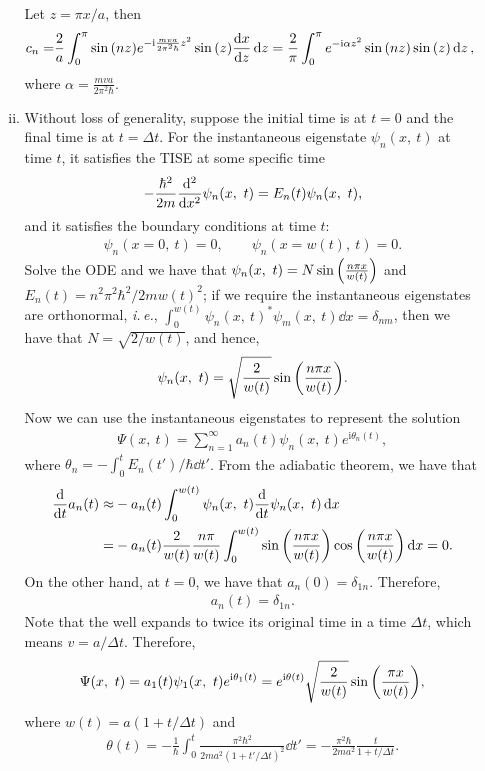 \documentclass{article}
\newcommand{\iu}{\ensuremath{\mathrm{i}}}
\begin{document}
\begin{enumerate}[1.]
\begin{enumerate}[(i)]
    Let $z = \pi x /a$, then
    \begin{align*}
      c_n =& \frac{2}{a} \int_0^\pi \sin\qty(nz) e^{-\iu\frac{mva}{2\pi^2\hbar}z^2} \sin\qty(z) \dv{x}{z}\dd{z} = \frac{2}{\pi} \int_0^\pi e^{-\iu\alpha z^2} \sin\qty(nz) \sin\qty(z) \dd{z},
    \end{align*}
    where $\alpha = \frac{mva}{2\pi^2\hbar}$.
    \item 
    Without loss of generality, suppose the initial time is at $t = 0$ and the final time is at $t = \Delta t$.
    For the instantaneous eigenstate $\psi_n(x,\ t)$ at time $t$, it satisfies the TISE at some specific time
    \begin{align*}
      -\frac{\hbar^2}{2m}\dv[2]{x}\psi_n(x,\ t) = E_n(t) \psi_n(x,\ t),
    \end{align*}
    and it satisfies the boundary conditions at time $t$:
    \begin{align*}
      \psi_n(x=0,\ t) = 0, \qquad \psi_n(x=w(t),\ t) = 0.
    \end{align*}
    Solve the ODE and we have that $\psi_n(x,\ t) = N\sin\qty(\frac{n\pi x}{w(t)})$ and $E_n(t) = n^2\pi^2\hbar^2/2mw(t)^2$; if we require the instantaneous eigenstates are orthonormal, \emph{i.\,e.}, $\int_0^{w(t)} \psi_n(x,\ t)^* \psi_m(x,\ t)  \dd{x} = \delta_{nm}$, then we have that $N = \sqrt{2/w(t)}$, and hence, 
    \begin{align*}
      \psi_n(x,\ t) = \sqrt{\frac{2}{w(t)}}\sin\qty(\frac{n\pi x}{w(t)}).
    \end{align*}
    Now we can use the instantaneous eigenstates to represent the solution
    \begin{align*}
      \Psi (x,\ t) = \sum_{n=1}^\infty a_n(t)\psi_{n}(x,\ t) e^{\iu\theta_{n}(t)},
    \end{align*}
    where $\theta_n = -\int_0^t E_n(t')/\hbar \dd{t'}$.
    From the adiabatic theorem, we have that
    \begin{align*}
      \dv{t} a_n(t) \approx& -a_n(t) \int_0^{w(t)} \psi_{n}(x,\ t) \dv{t} \psi_{n}(x,\ t) \dd{x}\\
      =&  -a_n(t) \frac{2}{w(t)} \frac{n\pi}{w(t)} \int_0^{w(t)} \sin\qty(\frac{n\pi x}{w(t)})\cos\qty(\frac{n\pi x}{w(t)}) \dd{x} 
      =0.
    \end{align*}
    On the other hand, at $t = 0$, we have that $a_n(0) = \delta_{1n}$. Therefore,
    \begin{align*}
      a_n(t) = \delta_{1n}.
    \end{align*}
    Note that the well expands to twice its original time in a time $\Delta t$, which means $v = a/\Delta t$. Therefore,
    \begin{align*}
      \Psi(x,\ t) = a_1(t)\psi_{1}(x,\ t) e^{\iu\theta_{1}(t)} = e^{\iu\theta(t)} \sqrt{\frac{2}{w(t)}}\sin\qty(\frac{\pi x}{w(t)}),
    \end{align*}
    where $w(t) = a(1+t/\Delta t)$ and 
    \begin{align*}
      \theta(t) = -\frac{1}{\hbar} \int_0^t \frac{\pi^2\hbar^2}{2ma^2(1+t'/\Delta t)^2}\dd{t'} = -\frac{\pi^2\hbar}{2ma^2} \frac{t}{1 + t/\Delta t}. 
    \end{align*}


\end{enumerate}
\end{enumerate}
\end{document}
